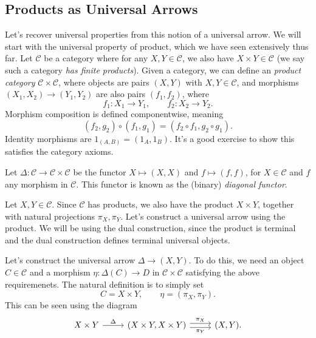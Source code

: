 \subsection{Products as Universal Arrows}

Let's recover universal properties from this notion of a universal arrow. We will start with the universal property of product, which we have seen extensively thus far. Let $\mathcal{C} $ be a category where for any $X,Y\in \mathcal{C} $, we also have $X\times Y\in \mathcal{C} $ (we say such a category \emph{has finite products}). Given a category, we can define an \emph{product category} $\mathcal{C} \times \mathcal{C} $, where objects are pairs $(X,Y)$ with $X,Y\in \mathcal{C} $, and morphisms $(X_1,X_2)\to (Y_1,Y_2)$ are also pairs $(f_1,f_2)$, where
\[
	f_1: X_1 \to Y_1,\qquad f_2: X_2 \to Y_2
.\]
Morphism composition is defined componentwise, meaning
\[
	(f_2,g_2)\circ (f_1,g_1)=(f_2\circ f_1,g_2\circ g_1)
.\]
Identity morphisms are $1_{(A,B)} =(1_A,1_B)$. It's a good exercise to show this satisfies the category axioms.

Let $\Delta : \mathcal{C}  \to \mathcal{C} \times \mathcal{C} $ be the functor $X\mapsto (X,X)$ and $f\mapsto (f,f)$, for $X\in \mathcal{C} $ and $f$ any morphism in $\mathcal{C} $. This functor is known as the (binary) \emph{diagonal functor}.

Let $X,Y\in \mathcal{C} $. Since $\mathcal{C} $ has products, we also have the product $X\times Y$, together with natural projections $\pi _X,\pi _Y$. Let's construct a universal arrow using the product. We will be using the dual construction, since the product is terminal and the dual construction defines terminal universal objects.

Let's construct the universal arrow $\Delta \to (X,Y)$. To do this, we need an object $C\in \mathcal{C} $ and a morphism $\eta : \Delta (C) \to D$ in $\mathcal{C} \times \mathcal{C} $ satisfying the above requiremenets. The natural definition is to simply set
\[
	C=X\times Y,\qquad \eta =(\pi _X,\pi _Y)
.\]
This can be seen using the diagram
\[\begin{tikzcd}[row sep = 2.5em, column sep = 2.5em]
	X\times Y\ar[" \Delta  ", r]  & (X\times Y,X\times Y)\ar[" \pi _X ", shift left, r] \ar[" \pi _Y "', shift right, r] & (X,Y).
\end{tikzcd}\]

